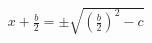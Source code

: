 \documentclass[preview]{standalone}
\begin{document}
\begin{align*}
x + \frac{b}{2} = \pm\sqrt{(\frac{b}{2})^2 - c}
\end{align*}
\end{document}
